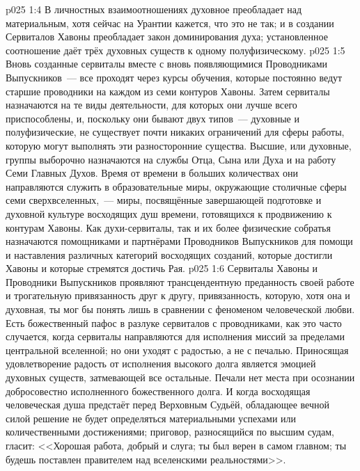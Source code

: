 \vs p025 1:4 \pc В личностных взаимоотношениях духовное преобладает над материальным, хотя сейчас на Урантии кажется, что это не так; и в создании Сервиталов Хавоны преобладает закон доминирования духа; установленное соотношение даёт трёх духовных существ к одному полуфизическому.
\vs p025 1:5 \pc Вновь созданные сервиталы вместе с вновь появляющимися Проводниками Выпускников~--- все проходят через курсы обучения, которые постоянно ведут старшие проводники на каждом из семи контуров Хавоны. Затем сервиталы назначаются на те виды деятельности, для которых они лучше всего приспособлены, и, поскольку они бывают двух типов~--- духовные и полуфизические, не существует почти никаких ограничений для сферы работы, которую могут выполнять эти разносторонние существа. Высшие, или духовные, группы выборочно назначаются на службы Отца, Сына или Духа и на работу Семи Главных Духов. Время от времени в больших количествах они направляются служить в образовательные миры, окружающие столичные сферы семи сверхвселенных,~--- миры, посвящённые завершающей подготовке и духовной культуре восходящих душ времени, готовящихся к продвижению к контурам Хавоны. Как духи\hyp{}сервиталы, так и их более физические собратья назначаются помощниками и партнёрами Проводников Выпускников для помощи и наставления различных категорий восходящих созданий, которые достигли Хавоны и которые стремятся достичь Рая.
\vs p025 1:6 Сервиталы Хавоны и Проводники Выпускников проявляют трансцендентную преданность своей работе и трогательную привязанность друг к другу, привязанность, которую, хотя она и духовная, ты мог бы понять лишь в сравнении с феноменом человеческой любви. Есть божественный пафос в разлуке сервиталов с проводниками, как это часто случается, когда сервиталы направляются для исполнения миссий за пределами центральной вселенной; но они уходят с радостью, а не с печалью. Приносящая удовлетворение радость от исполнения высокого долга является эмоцией духовных существ, затмевающей все остальные. Печали нет места при осознании добросовестно исполненного божественного долга. И когда восходящая человеческая душа предстаёт перед Верховным Судьёй, обладающее вечной силой решение не будет определяться материальными успехами или количественными достижениями; приговор, разносящийся по высшим судам, гласит: <<Хорошая работа, добрый и  слуга; ты был верен в самом главном; ты будешь поставлен правителем над вселенскими реальностями>>.
